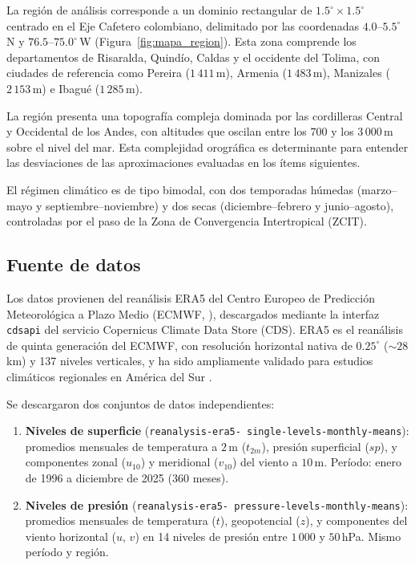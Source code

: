 \documentclass[12pt, a4paper]{article}
\begin{document}
La región de análisis corresponde a un dominio rectangular de
$1.5^{\circ} \times 1.5^{\circ}$ centrado en el Eje Cafetero
colombiano, delimitado por las coordenadas $4.0$--$5.5^{\circ}$\,N y
$76.5$--$75.0^{\circ}$\,W (Figura~\ref{fig:mapa_region}). Esta zona
comprende los departamentos de Risaralda, Quindío, Caldas y el
occidente del Tolima, con ciudades de referencia como Pereira
($1\,411$\,m), Armenia ($1\,483$\,m), Manizales ($2\,153$\,m) e
Ibagué ($1\,285$\,m).

La región presenta una topografía compleja dominada por las
cordilleras Central y Occidental de los Andes, con altitudes
que oscilan entre los $700$ y los $3\,000$\,m sobre el nivel
del mar. Esta complejidad orográfica es determinante para
entender las desviaciones de las aproximaciones evaluadas en
los ítems siguientes.

El régimen climático es de tipo bimodal, con dos temporadas
húmedas (marzo--mayo y septiembre--noviembre) y dos secas
(diciembre--febrero y junio--agosto), controladas por el paso
de la Zona de Convergencia Intertropical (ZCIT).

\subsection{Fuente de datos}

Los datos provienen del reanálisis ERA5 del Centro Europeo de
Predicción Meteorológica a Plazo Medio
(ECMWF, \citealt{hersbach2020era5}), descargados mediante la
interfaz \texttt{cdsapi} del servicio Copernicus Climate Data
Store (CDS). ERA5 es el reanálisis de quinta generación del
ECMWF, con resolución horizontal nativa de $0.25^{\circ}$
($\sim\!28$\,km) y 137 niveles verticales, y ha sido ampliamente
validado para estudios climáticos regionales en América
del Sur \citep{hersbach2020era5}.

Se descargaron dos conjuntos de datos independientes:

\begin{enumerate}
	\item \textbf{Niveles de superficie} (\texttt{reanalysis-era5-%
		single-levels-monthly-means}): promedios mensuales de
	temperatura a $2$\,m ($t_{2m}$), presión superficial ($sp$),
	y componentes zonal ($u_{10}$) y meridional ($v_{10}$) del
	viento a $10$\,m. Período: enero de 1996 a diciembre de 2025
	(360 meses).
	
	\item \textbf{Niveles de presión} (\texttt{reanalysis-era5-%
		pressure-levels-monthly-means}): promedios mensuales de
	temperatura ($t$), geopotencial ($z$), y componentes del
	viento horizontal ($u$, $v$) en 14 niveles de presión entre
	$1\,000$ y $50$\,hPa. Mismo período y región.
\end{enumerate}
\end{document}
